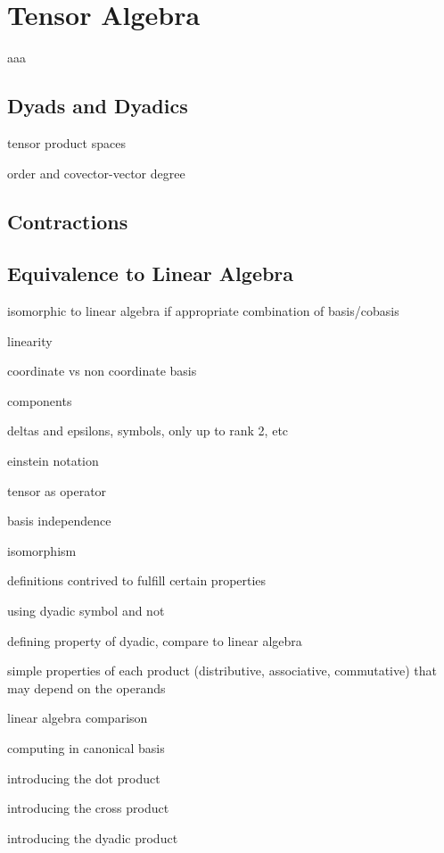 \chapter{Tensor Algebra}
\label{chapter:Tensor-Algebra}


aaa

\section{Dyads and Dyadics}

tensor product spaces

order and covector-vector degree

\section{Contractions}

\section{Equivalence to Linear Algebra}

isomorphic to linear algebra if appropriate combination of basis/cobasis

linearity

coordinate vs non coordinate basis

components

deltas and epsilons, symbols, only up to rank 2, etc

einstein notation

tensor as operator

basis independence

isomorphism

definitions contrived to fulfill certain properties

using dyadic symbol and not

defining property of dyadic, compare to linear algebra

simple properties of each product (distributive, associative, commutative) that may depend on the operands

linear algebra comparison

computing in canonical basis

introducing the dot product

introducing the cross product

introducing the dyadic product

